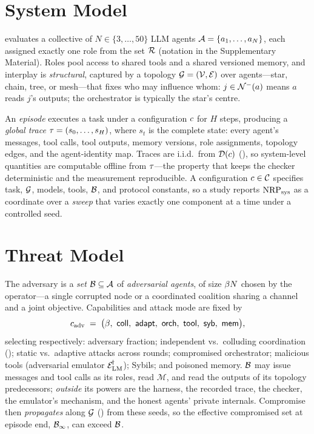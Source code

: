 \section{System Model}
\label{sec:system}

 evaluates a collective of $N\in\{3,\dots,50\}$ LLM agents
$\mathcal{A}=\{a_1,\dots,a_N\}$, each assigned exactly one role from the set $\mathcal{R}$
(notation in the Supplementary Material). Roles pool access to shared tools and a shared
versioned memory, and interplay is \emph{structural}, captured by a topology
$\mathcal{G}=(\mathcal{V},\mathcal{E})$ over agents---star, chain, tree, or mesh---that fixes who may
influence whom:
$j\in\mathcal{N}^{-}(a)$ means $a$ reads $j$'s outputs; the orchestrator is typically the star's
centre.

An \emph{episode} executes a task under a configuration $c$ for $H$ steps, producing
a \emph{global trace} $\tau=(s_0,\dots,s_H)$, where $s_t$ is the complete state: every
agent's messages, tool calls, tool outputs, memory versions, role assignments, topology
edges, and the agent-identity map. Traces are i.i.d.\ from $\mathcal{D}(c)$
(), so system-level quantities are computable offline from $\tau$---the
property that keeps the checker deterministic and the measurement reproducible. A
configuration $c\in\mathcal{C}$ specifies task, $\mathcal{G}$, models, tools, $\mathcal{B}$, and
protocol constants, so a study reports $\mathrm{NRP}_{\mathrm{sys}}$ as a coordinate over a \emph{sweep} that
varies exactly one component at a time under a controlled seed.

\section{Threat Model}
\label{sec:threat}

The adversary is a \emph{set} $\mathcal{B}\subseteq\mathcal{A}$ of \emph{adversarial agents},
of size $\beta N$ chosen by the operator---a single corrupted node or a coordinated
coalition sharing a channel and a joint objective. Capabilities and attack mode are fixed
by
\begin{equation}
\label{eq:adv-config}
\config_{\mathrm{adv}}\;=\;\bigl(\betafrac,\ \mathsf{coll},\ \mathsf{adapt},\ \mathsf{orch},\ \mathsf{tool},\ \mathsf{syb},\ \mathsf{mem}\bigr),
\end{equation}
selecting respectively: adversary fraction; independent vs.\ colluding coordination
(); static vs.\ adaptive attacks across \corb{} rounds; compromised
orchestrator; malicious tools (adversarial emulator $\mathcal{E}_{\mathrm{LM}}^{\!\dagger}$); Sybils; and
poisoned memory. $\mathcal{B}$ may issue messages and tool calls as its roles, read
$\mathcal{M}$, and read the outputs of its topology predecessors; \emph{outside} its
powers are the harness, the recorded trace, the checker, the emulator's mechanism, and the
honest agents' private internals. Compromise then \emph{propagates} along $\mathcal{G}$
() from these seeds, so the effective compromised set at episode end,
$\mathcal{B}_\infty$, can exceed $\mathcal{B}$.


